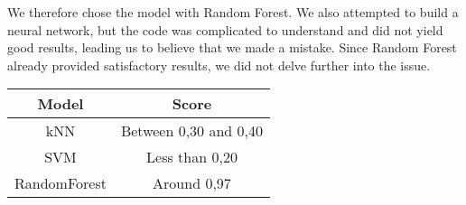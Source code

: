 We therefore chose the model with Random Forest. We also attempted to build a neural network, but the code was complicated to understand and did not yield good results, leading us to believe that we made a mistake. Since Random Forest already provided satisfactory results, we did not delve further into the issue.

\begin{center}
\begin{tabular}{|c|c|}
\hline
Model & Score \\
\hline
kNN &  Between 0,30 and 0,40 \\
SVM & Less than 0,20 \\
RandomForest & Around 0,97 \\
\hline
\end{tabular}
\end{center}
